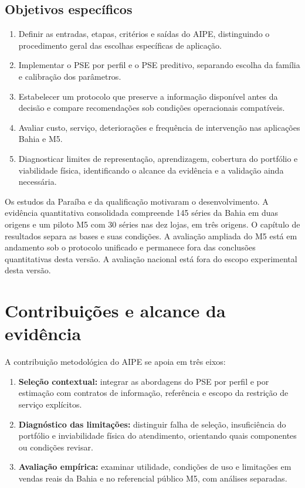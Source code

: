 \subsection*{Objetivos específicos}

\begin{enumerate}
  \item Definir as entradas, etapas, critérios e saídas do AIPE, distinguindo o procedimento geral das escolhas específicas de aplicação.
  \item Implementar o PSE por perfil e o PSE preditivo, separando escolha da família e calibração dos parâmetros.
  \item Estabelecer um protocolo que preserve a informação disponível antes da decisão e compare recomendações sob condições operacionais compatíveis.
  \item Avaliar custo, serviço, deteriorações e frequência de intervenção nas aplicações Bahia e M5.
  \item Diagnosticar limites de representação, aprendizagem, cobertura do portfólio e viabilidade física, identificando o alcance da evidência e a validação ainda necessária.
\end{enumerate}

Os estudos da Paraíba e da qualificação motivaram o desenvolvimento. A evidência quantitativa consolidada compreende 145 séries da Bahia em duas origens e um piloto M5 com 30 séries nas dez lojas, em três origens. O capítulo de resultados separa as bases e suas condições. A avaliação ampliada do M5 está em andamento sob o protocolo unificado e permanece fora das conclusões quantitativas desta versão. A avaliação nacional está fora do escopo experimental desta versão.

\section{Contribuições e alcance da evidência}

A contribuição metodológica do AIPE se apoia em três eixos:
\begin{enumerate}
  \item \textbf{Seleção contextual:} integrar as abordagens do PSE por perfil e por estimação com contratos de informação, referência e escopo da restrição de serviço explícitos.
  \item \textbf{Diagnóstico das limitações:} distinguir falha de seleção, insuficiência do portfólio e inviabilidade física do atendimento, orientando quais componentes ou condições revisar.
  \item \textbf{Avaliação empírica:} examinar utilidade, condições de uso e limitações em vendas reais da Bahia e no referencial público M5, com análises separadas.
\end{enumerate}

